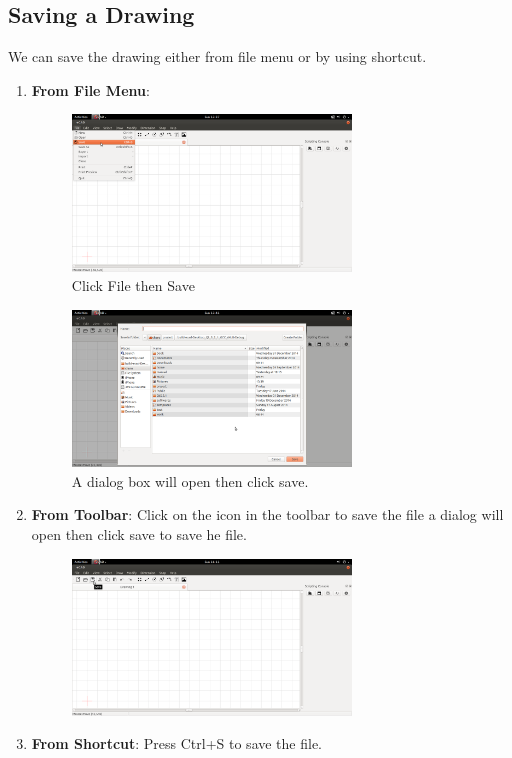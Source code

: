 \subsection{Saving a Drawing}
We can save the drawing either from file menu or by using shortcut.
\begin{enumerate}
\item \textbf{From File Menu}:
\begin{figure}[h!]
\centering
\includegraphics[width=0.7\textwidth]{images/filesave.png}\\
Click File then Save
\end{figure}
\begin{figure}[h!]
\centering
\includegraphics[width=0.7\textwidth]{images/savedialog.png}\\
A dialog box will open then click save.
\end{figure}
\item \textbf{From Toolbar}: Click on the icon in the toolbar to save the file a dialog will open then click save to save he file.
\begin{figure}[h!]
\centering
\includegraphics[width=0.7\textwidth]{images/toolsave.png}\\
\end{figure}
\item \textbf{From Shortcut}: Press Ctrl+S to save the file.
\end{enumerate}
\newpage
